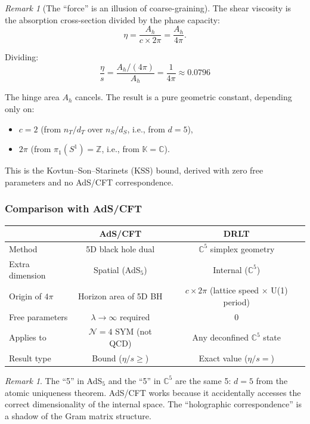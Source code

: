 \documentclass[12pt]{article}
\theoremstyle{remark}
\newtheorem{remark}[theorem]{Remark}
\theoremstyle{definition}
\newcommand{\CC}{\mathbb{C}}
\begin{document}
\begin{remark}[The ``force'' is an illusion of coarse-graining]
The shear viscosity is the absorption cross-section divided by the phase capacity:
\begin{equation}
\eta = \frac{A_h}{c \times 2\pi} = \frac{A_h}{4\pi}.
\end{equation}

Dividing:
\begin{equation}
\boxed{\frac{\eta}{s} = \frac{A_h/(4\pi)}{A_h} = \frac{1}{4\pi} \approx 0.0796}
\end{equation}

The hinge area $A_h$ cancels. The result is a pure geometric constant, depending only on:
\begin{itemize}
\item $c = 2$ (from $n_T/d_T$ over $n_S/d_S$, i.e., from $d = 5$),
\item $2\pi$ (from $\pi_1(S^1) = \mathbb{Z}$, i.e., from $\mathbb{K} = \CC$).
\end{itemize}

This is the Kovtun--Son--Starinets (KSS) bound, derived with zero free parameters and no AdS/CFT correspondence.

\subsubsection{Comparison with AdS/CFT}

\begin{center}
\begin{tabular}{lcc}
\hline
& AdS/CFT & DRLT \\
\hline
Method & 5D black hole dual & $\CC^5$ simplex geometry \\
Extra dimension & Spatial (AdS$_5$) & Internal ($\CC^5$) \\
Origin of $4\pi$ & Horizon area of 5D BH & $c \times 2\pi$ (lattice speed $\times$ U(1) period) \\
Free parameters & $\lambda \to \infty$ required & 0 \\
Applies to & $\mathcal{N} = 4$ SYM (not QCD) & Any deconfined $\CC^5$ state \\
Result type & Bound ($\eta/s \geq$) & Exact value ($\eta/s =$) \\
\hline
\end{tabular}
\end{center}

\begin{remark}
The ``5'' in AdS$_5$ and the ``5'' in $\CC^5$ are the same 5: $d = 5$ from the atomic uniqueness theorem. AdS/CFT works because it accidentally accesses the correct dimensionality of the internal space. The ``holographic correspondence'' is a shadow of the Gram matrix structure.
\end{remark}


\end{remark}
\end{document}
